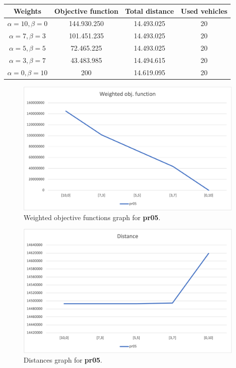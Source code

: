 {
\renewcommand{\arraystretch}{2}
\begin{longtable}[h]{| c | c | c | c |}
    \hline
    \textbf{Weights} & \textbf{Objective function} & \textbf{Total distance} & \textbf{Used vehicles} \\
    \hline
    \endhead
    $\alpha = 10, \beta = 0$ & 144.930.250 & 14.493.025 & 20 \\
    \hline
    $\alpha = 7, \beta = 3$  & 101.451.235 & 14.493.025 & 20 \\
    \hline
    $\alpha = 5, \beta = 5$  &  72.465.225 & 14.493.025 & 20 \\
    \hline
    $\alpha = 3, \beta = 7$  &  43.483.985 & 14.494.615 & 20 \\
    \hline
    $\alpha = 0, \beta = 10$ &         200 & 14.619.095 & 20 \\
    \hline
\end{longtable}
}
\begin{figure}[H]
    \centering
    \includegraphics[height=0.25\textheight]{../graphs/pr05-wobjf.png}
    \caption{Weighted objective functions graph for \textbf{pr05}.}
\end{figure}

\begin{figure}[H]
    \centering
    \includegraphics[height=0.25\textheight]{../graphs/pr05-distance.png}
    \caption{Distances graph for \textbf{pr05}.}
\end{figure}

